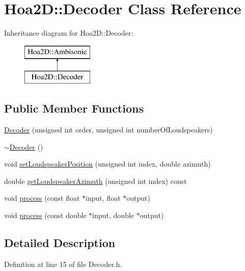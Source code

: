 \hypertarget{class_hoa2_d_1_1_decoder}{\section{Hoa2\-D\-:\-:Decoder Class Reference}
\label{class_hoa2_d_1_1_decoder}
}
Inheritance diagram for Hoa2\-D\-:\-:Decoder\-:\begin{figure}[H]
\begin{center}
\leavevmode
\includegraphics[height=2.000000cm]{class_hoa2_d_1_1_decoder}
\end{center}
\end{figure}
\subsection*{Public Member Functions}
\begin{DoxyCompactItemize}
\item 
\hyperlink{class_hoa2_d_1_1_decoder_a5d7f3ea76e2f50dbfff0e58b48b7cb1b}{Decoder} (unsigned int order, unsigned int number\-Of\-Loudspeakers)
\item 
\hyperlink{class_hoa2_d_1_1_decoder_a2ad3a9bafe6f452bcb378eabd53e0876}{$\sim$\-Decoder} ()
\item 
void \hyperlink{class_hoa2_d_1_1_decoder_a8a4711cff0311450892d268eb60c3a9e}{set\-Loudspeaker\-Position} (unsigned int index, double azimuth)
\item 
double \hyperlink{class_hoa2_d_1_1_decoder_aa07fa3b88a911fb2308fd593397f4bb9}{get\-Loudspeaker\-Azimuth} (unsigned int index) const 
\item 
void \hyperlink{class_hoa2_d_1_1_decoder_a68f00b02c0f8697ecd5364f772bcc9c0}{process} (const float $\ast$input, float $\ast$output)
\item 
void \hyperlink{class_hoa2_d_1_1_decoder_ab3ed928a777ea379b4fa02f65be7e996}{process} (const double $\ast$input, double $\ast$output)
\end{DoxyCompactItemize}


\subsection{Detailed Description}


Definition at line 15 of file Decoder.\-h.



